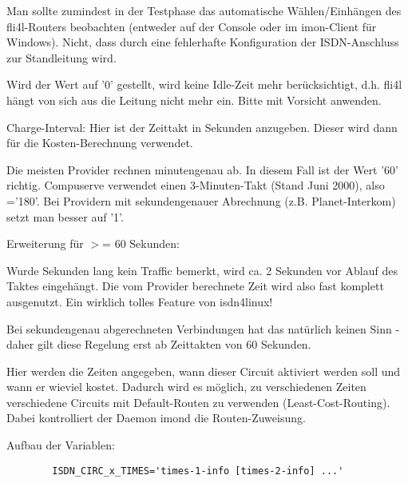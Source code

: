 \begin{description}
  Man sollte zumindest in der Testphase das automatische
  Wählen/Einhängen des fli4l-Routers beobachten (entweder auf der
  Console oder im imon-Client für Windows). Nicht, dass durch eine
  fehlerhafte Konfiguration der ISDN-Anschluss zur Standleitung wird.
  
  Wird der Wert auf '0' gestellt, wird keine Idle-Zeit mehr
  berücksichtigt, d.h. fli4l hängt von sich aus die Leitung nicht mehr
  ein. Bitte mit Vorsicht anwenden.
  
  
  Charge-Interval: Hier ist der Zeittakt in Sekunden anzugeben. Dieser
  wird dann für die Kosten-Berechnung verwendet.
  
  Die meisten Provider rechnen minutengenau ab. In diesem Fall ist der
  Wert '60' richtig. Compuserve verwendet einen 3-Minuten-Takt (Stand
  Juni 2000), also \linebreak {}='180'. Bei Providern mit
  sekundengenauer Abrechnung (z.B. Planet-Interkom) setzt man besser
   auf '1'.
  
  Erweiterung für  $>$= 60 Sekunden:
  
  Wurde  Sekunden lang kein Traffic
  bemerkt, wird ca. 2 Sekunden vor Ablauf des Taktes eingehängt. Die
  vom Provider berechnete Zeit wird also fast komplett ausgenutzt. Ein
  wirklich tolles Feature von isdn4linux!
  
  Bei sekundengenau abgerechneten Verbindungen hat das natürlich
  keinen Sinn - daher gilt diese Regelung erst ab Zeittakten von 60
  Sekunden.

  
  Hier werden die Zeiten angegeben, wann dieser Circuit aktiviert
  werden soll und wann er wieviel kostet. Dadurch wird es möglich, zu
  verschiedenen Zeiten verschiedene Circuits mit Default-Routen zu
  verwenden (Least-Cost-Routing). Dabei kontrolliert der Daemon imond
  die Routen-Zuweisung.
  
  Aufbau der Variablen:

\begin{example}
\begin{verbatim}
        ISDN_CIRC_x_TIMES='times-1-info [times-2-info] ...'
\end{verbatim}
\end{example}


\end{description}
